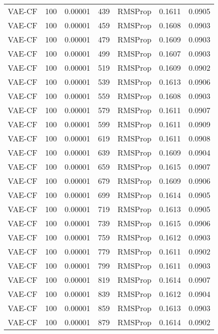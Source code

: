 \begin{tabular}{llrllrr}
  VAE-CF &  100 &  0.00001 &   439 &   RMSProp &  0.1611 &       0.0905 \\
  VAE-CF &  100 &  0.00001 &   459 &   RMSProp &  0.1608 &       0.0903 \\
  VAE-CF &  100 &  0.00001 &   479 &   RMSProp &  0.1609 &       0.0903 \\
  VAE-CF &  100 &  0.00001 &   499 &   RMSProp &  0.1607 &       0.0903 \\
  VAE-CF &  100 &  0.00001 &   519 &   RMSProp &  0.1609 &       0.0902 \\
  VAE-CF &  100 &  0.00001 &   539 &   RMSProp &  0.1613 &       0.0906 \\
  VAE-CF &  100 &  0.00001 &   559 &   RMSProp &  0.1608 &       0.0903 \\
  VAE-CF &  100 &  0.00001 &   579 &   RMSProp &  0.1611 &       0.0907 \\
  VAE-CF &  100 &  0.00001 &   599 &   RMSProp &  0.1611 &       0.0909 \\
  VAE-CF &  100 &  0.00001 &   619 &   RMSProp &  0.1611 &       0.0908 \\
  VAE-CF &  100 &  0.00001 &   639 &   RMSProp &  0.1609 &       0.0904 \\
  VAE-CF &  100 &  0.00001 &   659 &   RMSProp &  0.1615 &       0.0907 \\
  VAE-CF &  100 &  0.00001 &   679 &   RMSProp &  0.1609 &       0.0906 \\
  VAE-CF &  100 &  0.00001 &   699 &   RMSProp &  0.1614 &       0.0905 \\
  VAE-CF &  100 &  0.00001 &   719 &   RMSProp &  0.1613 &       0.0905 \\
  VAE-CF &  100 &  0.00001 &   739 &   RMSProp &  0.1615 &       0.0906 \\
  VAE-CF &  100 &  0.00001 &   759 &   RMSProp &  0.1612 &       0.0903 \\
  VAE-CF &  100 &  0.00001 &   779 &   RMSProp &  0.1611 &       0.0902 \\
  VAE-CF &  100 &  0.00001 &   799 &   RMSProp &  0.1611 &       0.0903 \\
  VAE-CF &  100 &  0.00001 &   819 &   RMSProp &  0.1614 &       0.0907 \\
  VAE-CF &  100 &  0.00001 &   839 &   RMSProp &  0.1612 &       0.0904 \\
  VAE-CF &  100 &  0.00001 &   859 &   RMSProp &  0.1613 &       0.0903 \\
  VAE-CF &  100 &  0.00001 &   879 &   RMSProp &  0.1614 &       0.0902 \\

\end{tabular}
